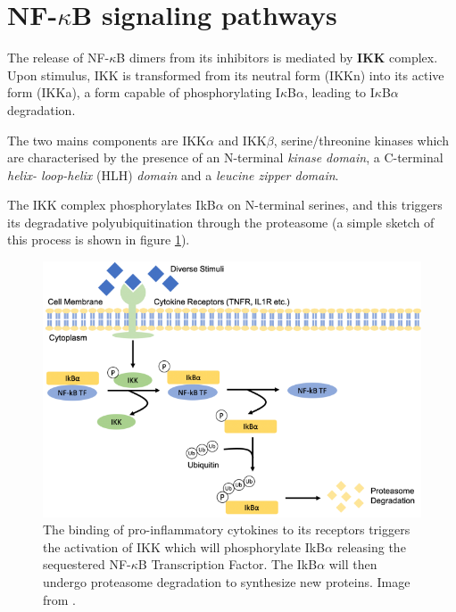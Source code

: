 \documentclass[12pt,a4paper]{report}
\begin{document}
\section{NF-\texorpdfstring{$\kappa$}{}B signaling pathways}\label{pathways}

The release of NF-$\kappa$B dimers from its inhibitors is mediated by \textbf{IKK} complex. Upon stimulus, IKK is transformed from its neutral form (IKKn) into its active form (IKKa), a form capable of phosphorylating I$\kappa$B$\alpha$, leading to I$\kappa$B$\alpha$ degradation. 

The two mains components are IKK$\alpha$ and IKK$\beta$, serine/threonine kinases which are characterised by the presence of an N-terminal \emph{kinase domain}, a C-terminal \emph{helix-
loop-helix} (HLH) \emph{domain} and a \emph{leucine zipper domain}.

The IKK complex phosphorylates IkB$\alpha$ on N-terminal serines, and this triggers its degradative polyubiquitination through the proteasome (a simple sketch of this process is shown in figure \ref{NFkBactivation}). 


\begin{figure}[!ht]
\includegraphics[scale=0.70]{NFkBactivation.png}
\caption{The binding of pro-inflammatory cytokines to its receptors triggers the activation of IKK which will phosphorylate IkB$\alpha$ releasing the sequestered NF-$\kappa$B Transcription Factor. The IkB$\alpha$ will then undergo proteasome degradation to synthesize new proteins. Image from \cite{Project}.}
\label{NFkBactivation}
\end{figure}
\end{document}
